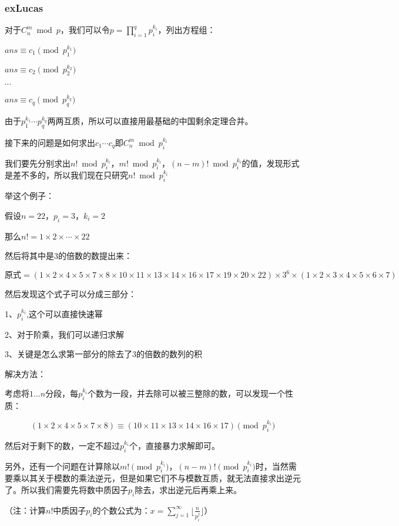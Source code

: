 \documentclass[twocolumn,a4]{article}
\begin{document}
\subsubsection{exLucas}
对于$C_n^m\bmod p$，我们可以令$p=\prod_{i=1}^{q}p_i^{k_i}$，列出方程组：

$ans\equiv c_1 \pmod {p_1^{k_1}}$

$ans\equiv c_2 \pmod {p_2^{k_2}}$

$\cdots$

$ans\equiv c_q \pmod {p_q^{k_q}}$

由于$p_1^{k_1} \cdots p_q^{k_q}$两两互质，所以可以直接用最基础的中国剩余定理合并。

接下来的问题是如何求出$c_1\cdots c_q$即$C_n^m\bmod p_i^{k_i}$

我们要先分别求出$n!\bmod p_i^{k_i}$，$m!\bmod p_i^{k_i}$，$(n-m)!\bmod p_i^{k_i}$的值，发现形式是差不多的，所以我们现在只研究$n!\bmod p_i^{k_i}$

举这个例子：

假设$n=22$，$p_i=3$，$k_i=2$

那么$n!=1\times 2 \times \cdots \times 22$

然后将其中是3的倍数的数提出来：

$原式=(1 \times 2 \times 4 \times 5 \times 7 \times 8 \times 10 \times 11 \times 13 \times 14 \times 16 \times 17 \times 19 \times 20 \times 22)\times 3^6 \times(1\times 2\times 3 \times 4 \times 5 \times 6 \times7)$

然后发现这个式子可以分成三部分：

1、$p_i^{k_i}$,这个可以直接快速幂

2、对于阶乘，我们可以递归求解

3、关键是怎么求第一部分的除去了3的倍数的数列的积

解决方法：

考虑将$1\dots n$分段，每$p_i^{k_i}$个数为一段，并去除可以被三整除的数，可以发现一个性质：

$$(1 \times 2 \times 4 \times 5 \times 7 \times 8) \equiv (10 \times 11 \times 13 \times 14 \times 16 \times 17)\pmod {p_i^{k_i}}$$

然后对于剩下的数，一定不超过$p_i^{k_i}$个，直接暴力求解即可。

另外，还有一个问题在计算除以$m!\pmod {p_i^{k_i}}$，$(n-m)!\pmod {p_i^{k_i}}$时，当然需要乘以其关于模数的乘法逆元，但是如果它们不与模数互质，就无法直接求出逆元了。所以我们需要先将数中质因子$p_i$除去，求出逆元后再乘上来。

（注：计算$n!$中质因子$p_i$的个数公式为：$x=\sum_{j=1}^{\infty}\lfloor \frac{n}{p_i^{j}} \rfloor$）
\end{document}
